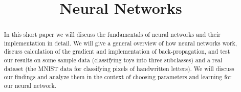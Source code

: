 \documentclass[11pt,letterpaper]{article}
\title{\vspace{-4ex}Neural Networks\vspace{-3.5ex}}
\begin{document}
\maketitle
\vspace{-0.5em}
\begin{abstract}
In this short paper we will discuss the fundamentals of neural networks and their implementation in detail. We will give a general overview of how neural networks work, discuss calculation of the gradient and implementation of back-propagation, and test our results on some sample data (classifying toys into three subclasses) and a real dataset (the MNIST data for classifying pixels of handwritten letters). We will discuss our findings and analyze them in the context of choosing parameters and learning for our neural network.
\end{abstract}
\end{document}
